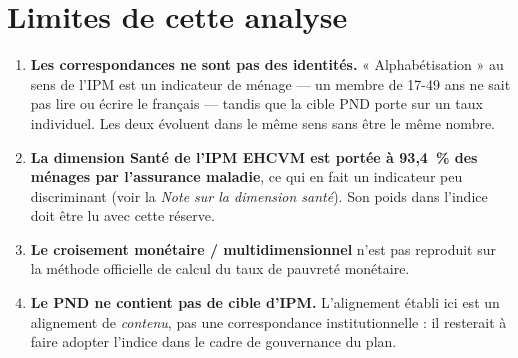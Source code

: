 \documentclass[11pt,a4paper]{article}
\begin{document}
\section{Limites de cette analyse}

\begin{enumerate}
  \item \textbf{Les correspondances ne sont pas des identités.} « Alphabétisation » au sens de
        l'IPM est un indicateur de ménage --- un membre de 17-49 ans ne sait pas lire ou écrire le
        français --- tandis que la cible PND porte sur un taux individuel. Les deux évoluent dans
        le même sens sans être le même nombre.
  \item \textbf{La dimension Santé de l'IPM EHCVM est portée à 93,4~\% des ménages par l'assurance
        maladie}, ce qui en fait un indicateur peu discriminant (voir la \emph{Note sur la
        dimension santé}). Son poids dans l'indice doit être lu avec cette réserve.
  \item \textbf{Le croisement monétaire / multidimensionnel} n'est pas reproduit sur la méthode
        officielle de calcul du taux de pauvreté monétaire.
  \item \textbf{Le PND ne contient pas de cible d'IPM.} L'alignement établi ici est un alignement
        de \emph{contenu}, pas une correspondance institutionnelle : il resterait à faire adopter
        l'indice dans le cadre de gouvernance du plan.
\end{enumerate}
\end{document}
